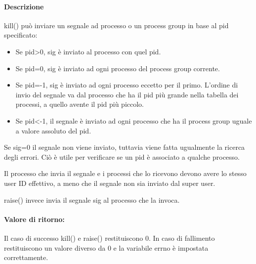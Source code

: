 \documentclass
[10pt,        %
 a4paper,     %
 onecolumn,   %
 fleqn,       %
 oneside,     %
 notitlepage, %
]{article}    %
\begin{document}
\paragraph{Descrizione}
kill() può inviare un segnale ad processo o un process group in base al pid specificato:

\begin{itemize}
    \item Se pid>0, sig è inviato al processo con quel pid.
    \item Se pid=0, sig è inviato ad ogni processo del process group corrente.
    \item Se pid=-1, sig è inviato ad ogni processo eccetto per il primo. L'ordine di invio del segnale va dal processo che ha il pid più grande nella tabella dei processi, a quello avente il pid più piccolo.
    \item Se pid<-1, il segnale è inviato ad ogni processo che ha il process group uguale a valore assoluto del pid.
\end{itemize}

Se sig=0 il segnale non viene inviato, tuttavia viene fatta ugualmente la ricerca degli errori. Ciò è utile per verificare se un pid è associato a qualche processo.

Il processo che invia il segnale e i processi che lo ricevono devono avere lo stesso user ID effettivo, a meno che il segnale non sia inviato dal super user.

raise() invece invia il segnale sig al processo che la invoca.



\paragraph{Valore di ritorno:}
Il caso di successo kill() e raise() restituiscono 0.
In caso di fallimento restituiscono un valore diverso da 0 e la variabile errno è impostata correttamente.
\end{document}
